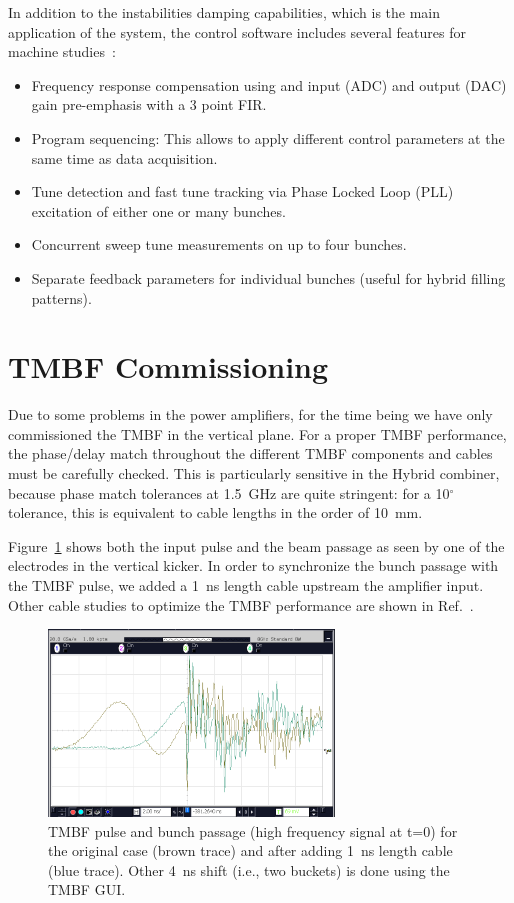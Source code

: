 \documentclass[a4paper,
              ]{jacow}
\begin{document}
In addition to the instabilities damping capabilities, which is the main application of the system, the control software includes several features for machine studies~\cite{DLS:IBIC15}: 
\begin{itemize}
\item Frequency response compensation using and input (ADC) and output (DAC) gain pre-emphasis with a 3 point FIR.
\item Program sequencing: This allows to apply different control parameters at the same time as data acquisition.
\item Tune detection and fast tune tracking via Phase Locked Loop (PLL) excitation of either one or many bunches.
\item Concurrent sweep tune measurements on up to four bunches. 
\item Separate feedback parameters for individual bunches (useful for hybrid filling patterns). 
\end{itemize}

\section{TMBF Commissioning}

Due to some problems in the power amplifiers, for the time being we have only commissioned the TMBF in the vertical plane. 
For a proper TMBF performance, the phase/delay match throughout the different TMBF components and cables must be carefully checked. This is particularly sensitive in the Hybrid combiner, because phase match tolerances at 1.5~GHz are quite stringent: for a 10$^{\circ}$ tolerance, this is equivalent to cable lengths in the order of 10~mm. 

Figure~\ref{pulse:synchro} shows both the input pulse and the beam passage as seen by one of the electrodes in the vertical kicker. In order to synchronize the bunch passage with the TMBF pulse, we added a 1~ns length cable upstream the amplifier input. Other cable studies to optimize the TMBF performance are shown in Ref.~\cite{MA:cables}.

\begin{figure}[hbt!]
   \centering
   \includegraphics[width=76mm]{img/TUPB046f4}
   \caption{TMBF pulse and bunch passage (high frequency signal at t=0) for the original case (brown trace) and after adding 1~ns length cable (blue trace). Other 4~ns shift (i.e., two buckets) is done using the TMBF GUI. }
   \label{pulse:synchro}
\end{figure}
\end{document}
